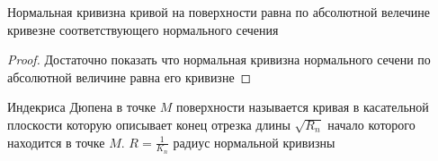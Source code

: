 \begin{theorem}
  Нормальная кривизна кривой на поверхности равна по абсолютной велечине
  кривезне соответствующего нормального сечения
\end{theorem}

\begin{proof}
  Достаточно показать что нормальная кривизна нормального сечени по
  абсолютной величине равна его кривизне
\end{proof}

\begin{define}
  Индекриса Дюпена в точке $M$ поверхности называется кривая в касательной
  плоскости которую описывает конец отрезка длины $\sqrt{R_n}$ начало
  которого находится в точке $M$. $R = \frac{1}{K_n}$ радиус нормальной
  кривизны
\end{define}